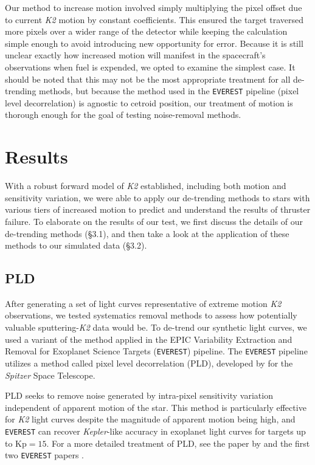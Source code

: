 \documentclass[12pt,preprint]{aastex}
\begin{document}
Our method to increase motion involved simply multiplying the pixel offset due to current \textit{K2} motion by constant coefficients. This ensured the target traversed more pixels over a wider range of the detector while keeping the calculation simple enough to avoid introducing new opportunity for error. Because it is still unclear exactly how increased motion will manifest in the spacecraft's observations when fuel is expended, we opted to examine the simplest case. It should be noted that this may not be the most appropriate treatment for all de-trending methods, but because the method used in the \texttt{EVEREST} pipeline (pixel level decorrelation) is agnostic to cetroid position, our treatment of motion is thorough enough for the goal of testing noise-removal methods.

\section{Results}

With a robust forward model of \textit{K2} established, including both motion and sensitivity variation, we were able to apply our de-trending methods to stars with various tiers of increased motion to predict and understand the results of thruster failure. To elaborate on the results of our test, we first discuss the details of our de-trending methods (\S 3.1), and then take a look at the application of these methods to our simulated data (\S 3.2).

\subsection{PLD}

After generating a set of light curves representative of extreme motion \textit{K2} observations, we tested systematics removal methods to assess how potentially valuable sputtering-\textit{K2} data would be. To de-trend our synthetic light curves, we used a variant of the method applied in the EPIC Variability Extraction and Removal for Exoplanet Science Targets (\texttt{EVEREST}) pipeline. The \texttt{EVEREST} pipeline utilizes a method called pixel level decorrelation (PLD), developed by \cite{0004-637X-805-2-132} for the \textit{Spitzer} Space Telescope.

PLD seeks to remove noise generated by intra-pixel sensitivity variation independent of apparent motion of the star. This method is particularly effective for \textit{K2} light curves despite the magnitude of apparent motion being high, and \texttt{EVEREST} can recover \textit{Kepler}-like accuracy in exoplanet light curves for targets up to $\text{Kp} = 15$. For a more detailed treatment of PLD, see the paper by \cite{0004-637X-805-2-132} and the first two \texttt{EVEREST} papers \citep{2016AJ....152..100L,2017arXiv170205488L}.
\end{document}
